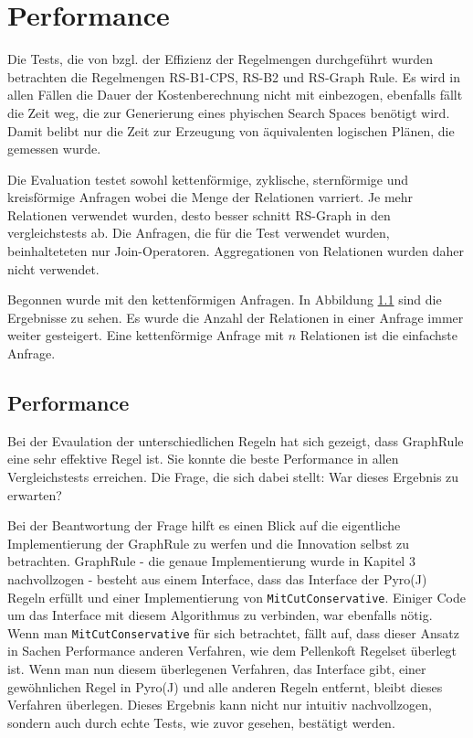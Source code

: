 \section{Performance}




Die Tests, die von \cite{} bzgl. der Effizienz der Regelmengen durchgeführt wurden betrachten die Regelmengen RS-B1-CPS, RS-B2 und RS-Graph Rule. Es wird in allen Fällen die Dauer der Kostenberechnung nicht mit einbezogen, ebenfalls fällt die Zeit weg, die zur Generierung eines phyischen Search Spaces benötigt wird. Damit belibt nur die Zeit zur Erzeugung von äquivalenten logischen Plänen, die gemessen wurde.

Die Evaluation testet sowohl kettenförmige, zyklische, sternförmige und kreisförmige Anfragen wobei die Menge der Relationen varriert. Je mehr Relationen verwendet wurden, desto besser schnitt RS-Graph in den vergleichstests ab. Die Anfragen, die für die Test verwendet wurden, beinhalteteten nur Join-Operatoren. Aggregationen von Relationen wurden daher nicht verwendet.

Begonnen wurde mit den kettenförmigen Anfragen. In Abbildung \ref{} sind die Ergebnisse zu sehen. Es wurde die Anzahl der Relationen in einer Anfrage immer weiter gesteigert. Eine kettenförmige Anfrage mit $n$ Relationen ist die einfachste Anfrage. 

\subsection{Performance}

Bei der Evaulation der unterschiedlichen Regeln hat sich gezeigt, dass GraphRule eine sehr effektive Regel ist. Sie konnte die beste Performance in allen Vergleichstests erreichen. Die Frage, die sich dabei stellt: War dieses Ergebnis zu erwarten?

Bei der Beantwortung der Frage hilft es einen Blick auf die eigentliche Implementierung der GraphRule zu werfen und die Innovation selbst zu betrachten. GraphRule - die genaue Implementierung wurde in Kapitel 3 nachvollzogen - besteht aus einem Interface, dass das Interface der Pyro(J) Regeln erfüllt und einer Implementierung von \texttt{MitCutConservative}. Einiger Code um das Interface mit diesem Algorithmus zu verbinden, war ebenfalls nötig. Wenn man \texttt{MitCutConservative} für sich betrachtet, fällt auf, dass dieser Ansatz in Sachen Performance anderen Verfahren, wie dem Pellenkoft Regelset überlegt ist. Wenn man nun diesem überlegenen Verfahren, das Interface gibt, einer gewöhnlichen Regel in Pyro(J) und alle anderen Regeln entfernt, bleibt dieses Verfahren überlegen. Dieses Ergebnis kann nicht nur intuitiv nachvollzogen, sondern auch durch echte Tests, wie zuvor gesehen, bestätigt werden.


